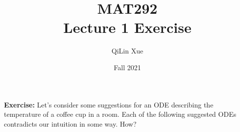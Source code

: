 \documentclass{article}
\title{MAT292 \\ Lecture 1 Exercise}
\author{QiLin Xue}
\date{Fall 2021}
\begin{document}
\newcommand{\tabitem}{~~\llap{\textbullet}~~}

\maketitle
\textbf{Exercise:} Let's consider some suggestions for an ODE describing the temperature of a coffee cup in a room. Each of the following suggested ODEs contradicts our intuition in some way. How?
\vspace{2mm}


    
\end{document}
